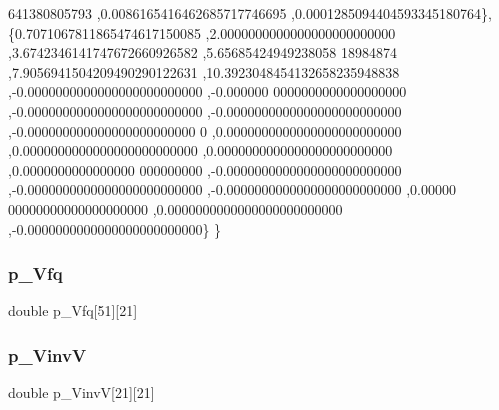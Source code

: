 \begin{DoxyCode}
      641380805793 ,0.0086165416462685717746695 ,0.0001285094404593345180764\},
\{0.7071067811865474617150085 ,2.0000000000000000000000000 ,3.6742346141747672660926582 ,5.65685424949238058
      18984874 ,7.9056941504209490290122631 ,10.3923048454132658235948838 ,-0.0000000000000000000000000 ,-0.000000
      0000000000000000000 ,-0.0000000000000000000000000 ,-0.0000000000000000000000000 ,-0.000000000000000000000000
      0 ,0.0000000000000000000000000 ,0.0000000000000000000000000 ,0.0000000000000000000000000 ,0.0000000000000000
      000000000 ,-0.0000000000000000000000000 ,-0.0000000000000000000000000 ,-0.0000000000000000000000000 ,0.00000
      00000000000000000000 ,0.0000000000000000000000000 ,-0.0000000000000000000000000\}
\}
\end{DoxyCode}
\mbox{\label{a00458_ae5deb51fb5c5c6ea701f1193a9919abb}} 
\subsubsection{\texorpdfstring{p\+\_\+\+Vfq}{p\_Vfq}}
{\footnotesize\ttfamily double p\+\_\+\+Vfq\mbox{[}51\mbox{]}\mbox{[}21\mbox{]}}

\mbox{\label{a00458_aff586a6144d6fbeb42d828acbb67cb2e}} 
\subsubsection{\texorpdfstring{p\+\_\+\+VinvV}{p\_VinvV}}
{\footnotesize\ttfamily double p\+\_\+\+VinvV\mbox{[}21\mbox{]}\mbox{[}21\mbox{]}}

